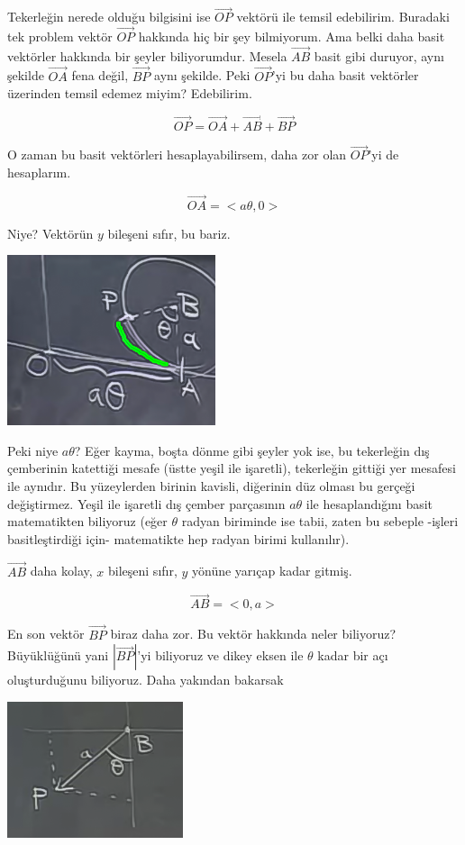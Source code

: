 \documentclass[12pt,fleqn]{article}\usepackage{../../common}
\begin{document}
Tekerleğin nerede olduğu bilgisini ise $\vec{OP}$ vektörü ile temsil
edebilirim. Buradaki tek problem vektör $\vec{OP}$ hakkında hiç bir şey
bilmiyorum. Ama belki daha basit vektörler hakkında bir şeyler
biliyorumdur. Mesela $\vec{AB}$ basit gibi duruyor, aynı şekilde $\vec{OA}$ fena
değil, $\vec{BP}$ aynı şekilde. Peki $\vec{OP}$'yi bu daha basit vektörler
üzerinden temsil edemez miyim? Edebilirim.

$$ \vec{OP} = \vec{OA} + \vec{AB} + \vec{BP} $$

O zaman bu basit vektörleri hesaplayabilirsem, daha zor olan $\vec{OP}$'yi
de hesaplarım. 

$$ \vec{OA} = < a\theta, 0 > $$

Niye? Vektörün $y$ bileşeni sıfır, bu bariz. 

\begin{center}
\includegraphics[height=5cm]{5_5.png}
\end{center}

Peki niye $a\theta$? Eğer kayma, boşta dönme gibi şeyler yok ise, bu tekerleğin
dış çemberinin katettiği mesafe (üstte yeşil ile işaretli), tekerleğin gittiği
yer mesafesi ile aynıdır. Bu yüzeylerden birinin kavisli, diğerinin düz olması
bu gerçeği değiştirmez. Yeşil ile işaretli dış çember parçasının $a\theta$ ile
hesaplandığını basit matematikten biliyoruz (eğer $\theta$ radyan biriminde ise
tabii, zaten bu sebeple -işleri basitleştirdiği için- matematikte hep radyan
birimi kullanılır).

$\vec{AB}$ daha kolay, $x$ bileşeni sıfır, $y$ yönüne yarıçap kadar
gitmiş. 

$$ \vec{AB} = <0, a> $$

En son vektör $\vec{BP}$ biraz daha zor. Bu vektör hakkında neler biliyoruz?
Büyüklüğünü yani $|\vec{BP}|$'yi biliyoruz ve dikey eksen ile $\theta$ kadar bir
açı oluşturduğunu biliyoruz. Daha yakından bakarsak

\begin{center}
\includegraphics[height=4cm]{5_6.png}
\end{center}
\end{document}
